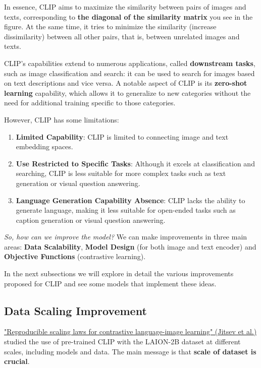 In essence, CLIP aims to maximize the similarity between pairs of images and texts, corresponding to \textbf{\textcolor{mybluee}{the diagonal of the similarity matrix}} you see in the figure. At the same time, it tries to minimize the similarity (increase dissimilarity) between all other pairs, that is, between unrelated images and texts. 

CLIP's capabilities extend to numerous applications, called \textbf{downstream tasks}, such as image classification and search: it can be used to search for images based on text descriptions and vice versa. A notable aspect of CLIP is its \textbf{zero-shot learning} capability, which allows it to generalize to new categories without the need for additional training specific to those categories. 

However, CLIP has some limitations:
\begin{enumerate}
    \item \textbf{Limited Capability}: CLIP is limited to connecting image and text embedding spaces.
    \item \textbf{Use Restricted to Specific Tasks}: Although it excels at classification and searching, CLIP is less suitable for more complex tasks such as text generation or visual question answering.
    \item \textbf{Language Generation Capability Absence}: CLIP lacks the ability to generate language, making it less suitable for open-ended tasks such as caption generation or visual question answering.
\end{enumerate}

\textit{So, how can we improve the model?} We can make improvements in three main areas: \textbf{Data Scalability}, \textbf{Model Design} (for both image and text encoder) and \textbf{Objective Functions} (contrastive learning).

In the next subsections we will explore in detail the various improvements proposed for CLIP and see some models that implement these ideas.


\subsection{Data Scaling Improvement}

\href{https://arxiv.org/pdf/2212.07143}{"Reproducible scaling laws for contrastive language-image learning" (Jitsev et al.)} studied the use of pre-trained CLIP with the LAION-2B dataset at different scales, including models and data. The main message is that \textbf{scale of dataset is crucial}.

